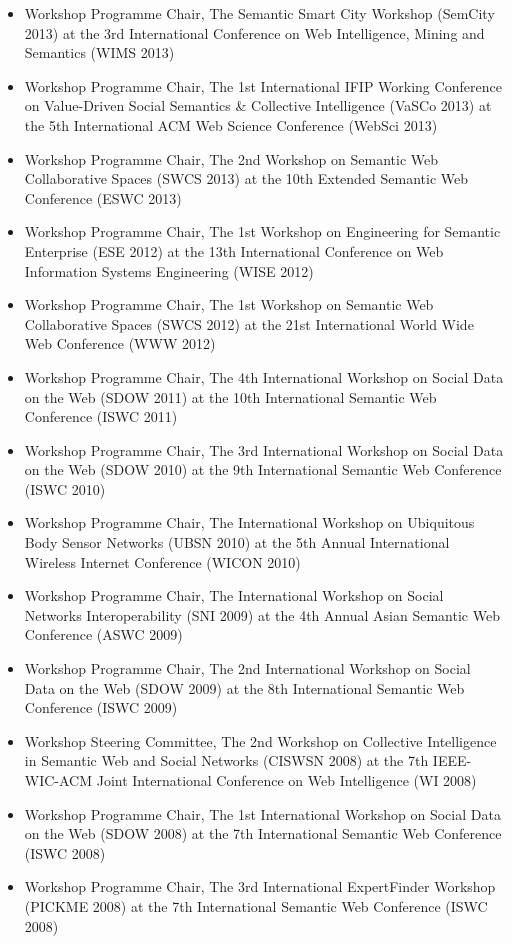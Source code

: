 \documentclass[10pt,a4paper]{res} %
\begin{document}
\begin{resume}
\begin{itemize}
\item Workshop Programme Chair, The Semantic Smart City Workshop (SemCity 2013) at the 3rd International Conference on Web Intelligence, Mining and Semantics (WIMS 2013)
\item Workshop Programme Chair, The 1st International IFIP Working Conference on Value-Driven Social Semantics \& Collective Intelligence (VaSCo 2013) at the 5th International ACM Web Science Conference (WebSci 2013)
\item Workshop Programme Chair, The 2nd Workshop on Semantic Web Collaborative Spaces (SWCS 2013) at the 10th Extended Semantic Web Conference (ESWC 2013)
\item Workshop Programme Chair, The 1st Workshop on Engineering for Semantic Enterprise (ESE 2012) at the 13th International Conference on Web Information Systems Engineering (WISE 2012)
\item Workshop Programme Chair, The 1st Workshop on Semantic Web Collaborative Spaces (SWCS 2012) at the 21st International World Wide Web Conference (WWW 2012)
\item Workshop Programme Chair, The 4th International Workshop on Social Data on the Web (SDOW 2011) at the 10th International Semantic Web Conference (ISWC 2011)
\item Workshop Programme Chair, The 3rd International Workshop on Social Data on the Web (SDOW 2010) at the 9th International Semantic Web Conference (ISWC 2010)
\item Workshop Programme Chair, The International Workshop on Ubiquitous Body Sensor Networks (UBSN 2010) at the 5th Annual International Wireless Internet Conference (WICON 2010)
\item Workshop Programme Chair, The International Workshop on Social Networks Interoperability (SNI 2009) at the 4th Annual Asian Semantic Web Conference (ASWC 2009)
\item Workshop Programme Chair, The 2nd International Workshop on Social Data on the Web (SDOW 2009) at the 8th International Semantic Web Conference (ISWC 2009)
\item Workshop Steering Committee, The 2nd Workshop on Collective Intelligence in Semantic Web and Social Networks (CISWSN 2008) at the 7th IEEE-WIC-ACM Joint International Conference on Web Intelligence (WI 2008)
\item Workshop Programme Chair, The 1st International Workshop on Social Data on the Web (SDOW 2008) at the 7th International Semantic Web Conference (ISWC 2008)
\item Workshop Programme Chair, The 3rd International ExpertFinder Workshop (PICKME 2008) at the 7th International Semantic Web Conference (ISWC 2008)

\end{itemize}
\end{resume}
\end{document}

